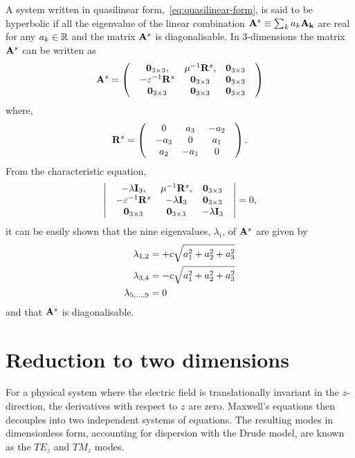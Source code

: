 A system written in quasilinear form,~\eqref{eq:quasilinear-form}, is said to be
hyperbolic if all the eigenvalue of the linear combination $ \mathbf{A}^{s} \equiv
\sum_{k} a_{k} \mathbf{A}_\mathbf{k} $ are real for any $a_{k} \in \mathbb{R}$ and
the matrix $\mathbf{A}^{s}$ is diagonalisable. In $3$-dimensions the matrix
$\mathbf{A}^{s}$ can be written as
$$
  \mathbf{A}^{s} =
  \begin{pmatrix}
 & \mathbf{0}_{3\times3} , & \mu^{-1} \mathbf{R}^{s}, & \mathbf{0}_{3\times3} \\
 & - \varepsilon^{-1} \mathbf{R}^{s} & \mathbf{0}_{3\times3} & \mathbf{0}_{3\times3} \\
 & \mathbf{0}_{3\times3} & \mathbf{0}_{3\times3} & \mathbf{0}_{3\times3} 
 & \end{pmatrix}
$$
where,
$$
  \mathbf{R}^{s} =
  \begin{pmatrix}
 & 0 & a_3 & -a_2 \\
 & -a_3 & 0 & a_1 \\
& a_2 & -a_1 & 0 
 & \end{pmatrix} .
$$
From the characteristic equation,
$$
  \begin{vmatrix}
 & -\lambda \mathbf{I}_3, & \mu^{-1} \mathbf{R}^{s}, & \mathbf{0}_{3\times3} \\
 & - \varepsilon^{-1} \mathbf{R}^{s} & -\lambda \mathbf{I}_3 & \mathbf{0}_{3\times3} \\
 & \mathbf{0}_{3\times3} & \mathbf{0}_{3\times3} & -\lambda \mathbf{I}_3
 & \end{vmatrix}
= 0 ,
$$
it can be easily shown that the nine eigenvalues, $\lambda_{i}$, of $\mathbf{A}^{s}$ are given by
\begin{align*}
  \lambda_{1,2} &= + c \sqrt{a_1^2 + a_2^2 + a_3^2} \\
  \lambda_{3,4} &= - c \sqrt{a_1^2 + a_2^2 + a_3^2} \\
\lambda_{5,...,9} &= 0
\end{align*}
and that $\mathbf{A}^{s}$ is diagonalisable.
\section{Reduction to two dimensions}
For a physical system where the electric field is translationally invariant in the $z$-direction, the derivatives with respect to $z$ are zero. Maxwell's equations then decouples into two independent systems of equations. The resulting modes in dimensionless form, accounting for dispersion with the Drude model, are known as the $TE_z$ and $TM_z$ modes.

